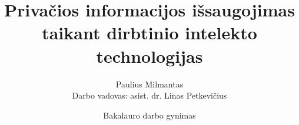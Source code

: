
\title[Privačios informacijos išsaugojimas]
{Privačios informacijos išsaugojimas taikant dirbtinio intelekto technologijas}

\author[Paulius Milmantas]
{Paulius Milmantas\\
Darbo vadovas: asist. dr. Linas Petkevičius}
 

\date[2021-05-14]{Bakalauro darbo gynimas}
